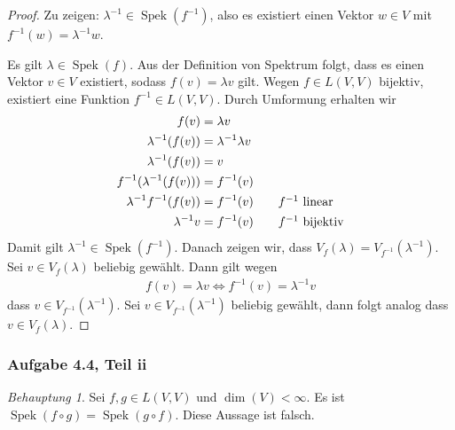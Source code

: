 \documentclass[draft,a5paper]{article}
\theoremstyle{remark}
\newtheorem*{beh}{Behauptung}
\DeclareMathOperator{\Spek}{Spek}
\begin{document}
\begin{proof}
  Zu zeigen: \(\lambda^{-1} \in \Spek(f^{-1})\), also es existiert einen
  Vektor \(w \in V\) mit \(f^{-1}(w) = \lambda^{-1} w\).

  Es gilt \(\lambda \in \Spek(f)\).  Aus der Definition von Spektrum folgt,
  dass es einen Vektor \(v \in V\) existiert, sodass
  \(f(v) = \lambda v\) gilt.  Wegen \(f \in L(V, V)\) bijektiv, existiert
  eine Funktion \(f^{-1} \in L(V, V)\). Durch Umformung erhalten wir
  \begin{align*}
    f(v) &= \lambda v \\
    \lambda^{-1} (f(v)) &= \lambda^{-1} \lambda v \\
    \lambda^{-1} (f(v)) &= v \\
    f^{-1}(\lambda^{-1} (f(v))) &= f^{-1}(v) \\
    \lambda^{-1} f^{-1}(f(v)) &= f^{-1}(v) \tag*{\(f^{-1}\) linear} \\
    \lambda^{-1} v &= f^{-1}(v) \tag*{\(f^{-1}\) bijektiv}
  \end{align*}
  Damit gilt \(\lambda^{-1} \in \Spek(f^{-1})\).  Danach zeigen wir, dass
  \(V_{f}(\lambda) = V_{f^{-1}}(\lambda^{-1})\).  Sei \(v \in V_{f}(\lambda)\) beliebig
  gewählt.  Dann gilt wegen
  \begin{align*}
    f(v) = \lambda v \iff f^{-1}(v) = \lambda^{-1} v
  \end{align*}
  dass \(v \in V_{f^{-1}}(\lambda^{-1})\).  Sei \(v \in V_{f^{-1}}(\lambda^{-1})\) beliebig
  gewählt, dann folgt analog dass \(v \in V_{f}(\lambda)\).
\end{proof}

\subsubsection*{Aufgabe 4.4, Teil ii}

\begin{beh}
  Sei \(f, g \in L(V, V)\) und \(\dim(V) < \infty\).  Es ist \(\Spek(f \circ g) =
  \Spek(g \circ f)\).  Diese Aussage ist falsch.
\end{beh}
\end{document}
